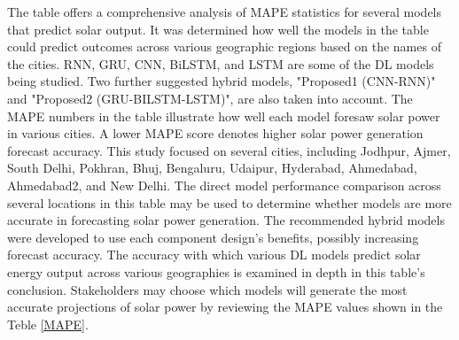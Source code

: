   The table offers a comprehensive analysis of MAPE statistics for several models that predict solar output. It was determined how well the models in the table could predict outcomes across various geographic regions based on the names of the cities. RNN, GRU, CNN, BiLSTM, and LSTM are some of the DL models being studied. Two further suggested hybrid models, "Proposed1 (CNN-RNN)" and "Proposed2 (GRU-BILSTM-LSTM)", are also taken into account. The MAPE numbers in the table illustrate how well each model foresaw solar power in various cities. A lower MAPE score denotes higher solar power generation forecast accuracy. This study focused on several cities, including Jodhpur, Ajmer, South Delhi, Pokhran, Bhuj, Bengaluru, Udaipur, Hyderabad, Ahmedabad, Ahmedabad2, and New Delhi. The direct model performance comparison across several locations in this table may be used to determine whether models are more accurate in forecasting solar power generation. The recommended hybrid models were developed to use each component design's benefits, possibly increasing forecast accuracy. The accuracy with which various DL models predict solar energy output across various geographies is examined in depth in this table's conclusion. Stakeholders may choose which models will generate the most accurate projections of solar power by reviewing the MAPE values shown in the Teble \ref{MAPE}.
  
  
  
  
  
  
  
  
  
  
  
